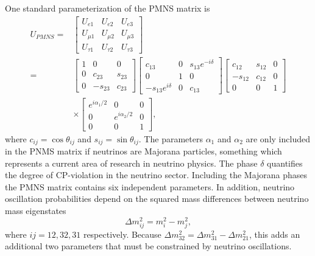 One standard parameterization of the PMNS matrix is 
\begin{equation}
    \begin{split}
        U_{PMNS}=&\begin{bmatrix}
            U_{e1}&U_{e2}&U_{e3}\\
            U_{\mu 1}&U_{\mu 2}&U_{\mu 3}\\
            U_{\tau 1}&U_{\tau 2}&U_{\tau 3}
        \end{bmatrix}\\
        =&\begin{bmatrix}
            1&0&0\\0&c_{23}&s_{23}\\0&-s_{23}&c_{23}
        \end{bmatrix}
        \begin{bmatrix}
            c_{13}&0&s_{13}e^{-i\delta}\\0&1&0\\-s_{13}e^{i\delta}&0&c_{13}
        \end{bmatrix}
        \begin{bmatrix}
            c_{12}&s_{12}&0\\-s_{12}&c_{12}&0\\0&0&1
        \end{bmatrix}\\
        &\times
        \begin{bmatrix}
            e^{i\alpha_1/2}&0&0\\
            0&e^{i\alpha_2/2}&0\\
            0&0&1
        \end{bmatrix},
    \end{split}
\end{equation}
where $c_{ij}=\cos{\theta_{ij}}$ and $s_{ij}=\sin{\theta_{ij}}$. The parameters $\alpha_1$ and $\alpha_2$ are only included in the PNMS matrix if neutrinos are Majorana particles, something which represents a current area of research in neutrino physics. The phase $\delta$ quantifies the degree of CP-violation in the neutrino sector. Including the Majorana phases the PMNS matrix contains six independent parameters. In addition, neutrino oscillation probabilities depend on the squared mass differences between neutrino mass eigenstates
\begin{equation}
    \Delta m_{ij}^2=m_i^2-m_j^2,
\end{equation}
where $ij=12,32,31$ respectively. Because $\Delta m_{32}^2=\Delta m_{31}^2-\Delta m_{21}^2$, this adds an additional two parameters that must be constrained by neutrino oscillations. 

